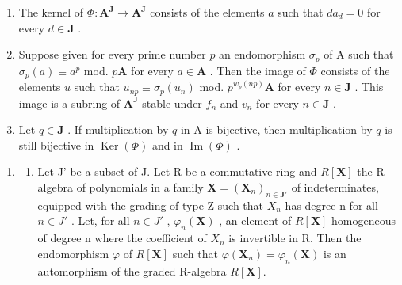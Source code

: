 \begin{enumerate}
\def\labelenumi{\alph{enumi})}
\item
  The kernel of \(\Phi: \mathbf{A}^{\mathbf{J}} \to \mathbf{A}^{\mathbf{J}}\) consists of the elements \(a\) such that \(da_d = 0\) for every \(d \in \mathbf{J}\) .
\item
  Suppose given for every prime number \(p\) an endomorphism \(\sigma_p\) of A such that \(\sigma_p(a) \equiv a^p\) mod. \(p\mathbf{A}\) for every \(a \in \mathbf{A}\) . Then the image of \(\Phi\) consists of the elements \(u\) such that \(u_{np} \equiv \sigma_p(u_n)\) mod. \(p^{w_p(np)}\mathbf{A}\) for every \(n \in \mathbf{J}\) . This image is a subring of \(\mathbf{A}^{\mathbf{J}}\) stable under \(f_n\) and \(v_n\) for every \(n \in \mathbf{J}\) .
\item
  Let \(q \in \mathbf{J}\) . If multiplication by \(q\) in A is bijective, then multiplication by \(q\) is still bijective in \(\operatorname{Ker}(\Phi)\) and in \(\operatorname{Im}(\Phi)\) .
\end{enumerate}

\begin{enumerate}
\def\labelenumi{\arabic{enumi})}
\setcounter{enumi}{32}
\tightlist
\item
  \begin{enumerate}
  \def\labelenumii{\alph{enumii})}
  \tightlist
  \item
    Let J' be a subset of J. Let R be a commutative ring and \(R[\mathbf{X}]\) the R-algebra of polynomials in a family \(\mathbf{X} = (\mathbf{X}_{n})_{n \in \mathbf{J'}}\) of indeterminates, equipped with the grading of type Z such that \(X_{n}\) has degree n for all \(n \in J'\) . Let, for all \(n \in J'\) , \(\varphi_{n}(\mathbf{X})\) , an element of \(R[\mathbf{X}]\) homogeneous of degree n where the coefficient of \(X_{n}\) is invertible in R. Then the endomorphism \(\varphi\) of \(R[\mathbf{X}]\) such that \(\varphi(\mathbf{X}_{n}) = \varphi_{n}(\mathbf{X})\) is an automorphism of the graded R-algebra \(R[\mathbf{X}]\).
  \end{enumerate}
\end{enumerate}

